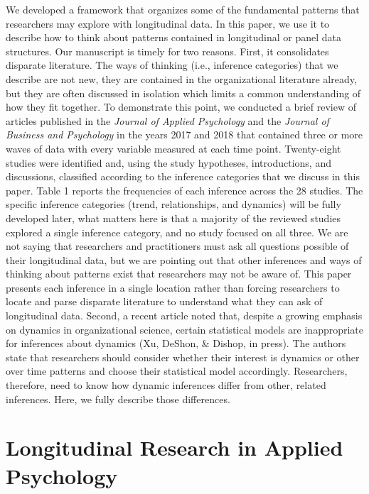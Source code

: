 \documentclass[english,,man]{apa6}
\begin{document}
We developed a framework that organizes some of the fundamental patterns that researchers may explore with longitudinal data. In this paper, we use it to describe how to think about patterns contained in longitudinal or panel data structures. Our manuscript is timely for two reasons. First, it consolidates disparate literature. The ways of thinking (i.e., inference categories) that we describe are not new, they are contained in the organizational literature already, but they are often discussed in isolation which limits a common understanding of how they fit together. To demonstrate this point, we conducted a brief review of articles published in the \emph{Journal of Applied Psychology} and the \emph{Journal of Business and Psychology} in the years 2017 and 2018 that contained three or more waves of data with every variable measured at each time point. Twenty-eight studies were identified and, using the study hypotheses, introductions, and discussions, classified according to the inference categories that we discuss in this paper. Table 1 reports the frequencies of each inference across the 28 studies. The specific inference categories (trend, relationships, and dynamics) will be fully developed later, what matters here is that a majority of the reviewed studies explored a single inference category, and no study focused on all three. We are not saying that researchers and practitioners must ask all questions possible of their longitudinal data, but we are pointing out that other inferences and ways of thinking about patterns exist that researchers may not be aware of. This paper presents each inference in a single location rather than forcing researchers to locate and parse disparate literature to understand what they can ask of longitudinal data. Second, a recent article noted that, despite a growing emphasis on dynamics in organizational science, certain statistical models are inappropriate for inferences about dynamics (Xu, DeShon, \& Dishop, in press). The authors state that researchers should consider whether their interest is dynamics or other over time patterns and choose their statistical model accordingly. Researchers, therefore, need to know how dynamic inferences differ from other, related inferences. Here, we fully describe those differences.

\hypertarget{longitudinal-research-in-applied-psychology}{%
\section{Longitudinal Research in Applied Psychology}\label{longitudinal-research-in-applied-psychology}}
\end{document}
